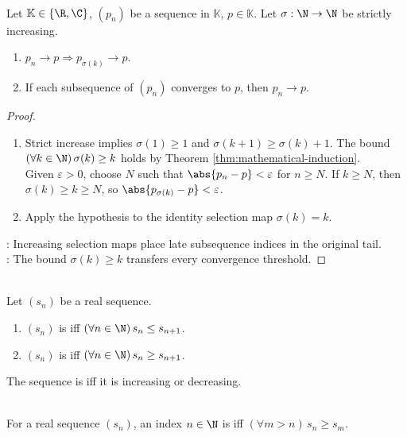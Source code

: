 \begin{proposition} \label{prop:subsequences-of-convergent-sequences} \\
Let $\mathbb{K}\in\{\R,\C\}$, $(p_n)$ be a sequence in $\mathbb{K}$, $p\in\mathbb{K}$. Let $\sigma:\N\to\N$ be strictly increasing.
\begin{enumerate}[label=(\roman*)]
\setlength{\itemsep}{0pt}
\item $p_n\to p\Rightarrow p_{\sigma(k)}\to p$.
\item If each subsequence of $(p_n)$ converges to $p$, then $p_n\to p$.
\end{enumerate}
\begin{proof}
\begin{enumerate}[label=(\roman*)]
\setlength{\itemsep}{0pt}
\item Strict increase implies $\sigma(1)\geq1$ and $\sigma(k+1)\geq\sigma(k)+1$. The bound $(\forall k\in\N)\,\sigma(k)\geq k$ holds by Theorem \ref{thm:mathematical-induction}.\\
Given $\varepsilon>0$, choose $N$ such that $\abs{p_n-p}<\varepsilon$ for $n\geq N$. If $k\geq N$, then $\sigma(k)\geq k\geq N$, so $\abs{p_{\sigma(k)}-p}<\varepsilon$.
\item Apply the hypothesis to the identity selection map $\sigma(k)=k$.
\end{enumerate}
: Increasing selection maps place late subsequence indices in the original tail.\\
: The bound $\sigma(k)\geq k$ transfers every convergence threshold.
\end{proof}
\end{proposition}

\begin{definition} \label{def:monotone-sequence} \\
Let $(s_n)$ be a real sequence.
\begin{enumerate}[label=(\roman*)]
\setlength{\itemsep}{0pt}
\item $(s_n)$ is  iff $(\forall n\in\N)\,s_n\leq s_{n+1}$.
\item $(s_n)$ is  iff $(\forall n\in\N)\,s_n\geq s_{n+1}$.
\end{enumerate}
The sequence is  iff it is increasing or decreasing.
\end{definition}

\begin{definition} \label{def:dominant-index} \\
For a real sequence $(s_n)$, an index $n\in\N$ is  iff $(\forall m>n)\,s_n\geq s_m$.
\end{definition}

